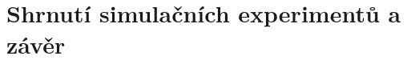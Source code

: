 \documentclass[11pt, a4paper, titlepage]{article}
\begin{document}
%
%

\section{Shrnutí simulačních experimentů a závěr}
\end{document}
